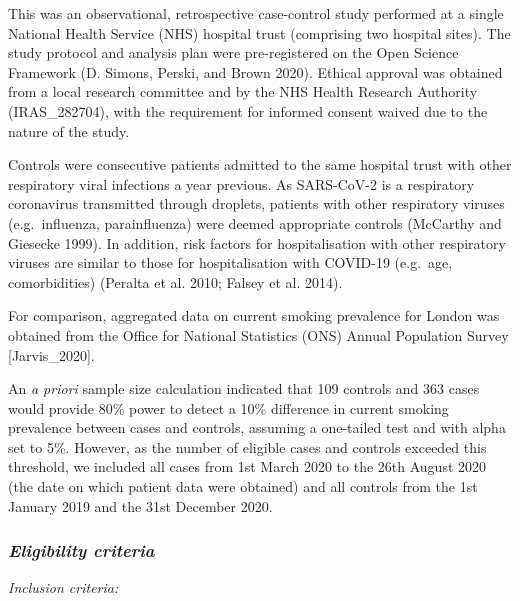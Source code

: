\documentclass[
]{article}
\begin{document}
This was an observational, retrospective case-control study performed at
a single National Health Service (NHS) hospital trust (comprising two
hospital sites). The study protocol and analysis plan were
pre-registered on the Open Science Framework (D. Simons, Perski, and
Brown 2020). Ethical approval was obtained from a local research
committee and by the NHS Health Research Authority (IRAS\_282704), with
the requirement for informed consent waived due to the nature of the
study.

Controls were consecutive patients admitted to the same hospital trust
with other respiratory viral infections a year previous. As SARS-CoV-2
is a respiratory coronavirus transmitted through droplets, patients with
other respiratory viruses (e.g.~influenza, parainfluenza) were deemed
appropriate controls (McCarthy and Giesecke 1999). In addition, risk
factors for hospitalisation with other respiratory viruses are similar
to those for hospitalisation with COVID-19 (e.g.~age, comorbidities)
(Peralta et al. 2010; Falsey et al. 2014).

For comparison, aggregated data on current smoking prevalence for London
was obtained from the Office for National Statistics (ONS) Annual
Population Survey {[}Jarvis\_2020{]}.

An \emph{a priori} sample size calculation indicated that 109 controls
and 363 cases would provide 80\% power to detect a 10\% difference in
current smoking prevalence between cases and controls, assuming a
one-tailed test and with alpha set to 5\%. However, as the number of
eligible cases and controls exceeded this threshold, we included all
cases from 1st March 2020 to the 26th August 2020 (the date on which
patient data were obtained) and all controls from the 1st January 2019
and the 31st December 2020.

\hypertarget{eligibility-criteria}{%
\subsubsection{\texorpdfstring{\emph{Eligibility
criteria}}{Eligibility criteria}}\label{eligibility-criteria}}

\emph{Inclusion criteria:}
\end{document}
